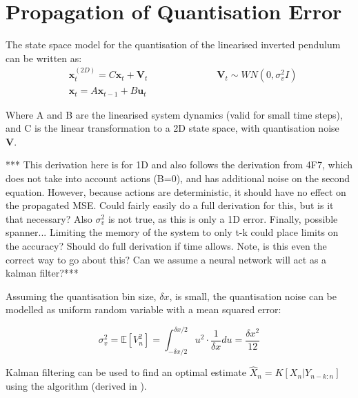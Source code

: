 \documentclass[../main.tex]{subfiles}
\begin{document}
\section{Propagation of Quantisation Error}{
\label{appendix:quant}
\newcommand{\bx}[1]{\boldsymbol{x}_{#1}}
\newcommand{\bu}[1]{\boldsymbol{u}_{#1}}

The state space model for the quantisation of the linearised inverted pendulum can be written as:
\begin{align}
    &\bx{t}^{(2D)} = C\bx{t} + \boldsymbol{V}_t \hspace{3cm} \boldsymbol{V}_t \sim WN(0, \sigma_v^2I) \\
    &\bx{t} = A \bx{t-1} + B\bu{t}
\end{align}

Where A and B are the linearised system dynamics (valid for small time steps), and C is the linear transformation to a 2D state space, with quantisation noise \textbf{V}.

*** This derivation here is for 1D and also follows the derivation from 4F7, which does not take into account actions (B=0), and has additional noise on the second equation. However, because actions are deterministic, it should have no effect on the propagated MSE. Could fairly easily do a full derivation for this, but is it that necessary? Also $\sigma_v^2$ is not true, as this is only a 1D error. Finally, possible spanner... Limiting the memory of the system to only t-k could place limits on the accuracy? Should do full derivation if time allows. Note, is this even the correct way to go about this? Can we assume a neural network will act as a kalman filter?***

Assuming the quantisation bin size, $\delta x$, is small, the quantisation noise can be modelled as uniform random variable with a mean squared error:

\begin{equation}
    \sigma_v^2 = \mathbb{E}[V_n^2] = \int^{\delta x/2}_{-\delta x/2} u^2 \cdot \frac{1}{\delta x} du = \frac{\delta x^2}{12}
\end{equation}

Kalman filtering can be used to find an optimal estimate $\hat{X}_n = K[X_n | Y_{n-k:n}]$ using the algorithm (derived in \cite{4f7}).

}
\end{document}
